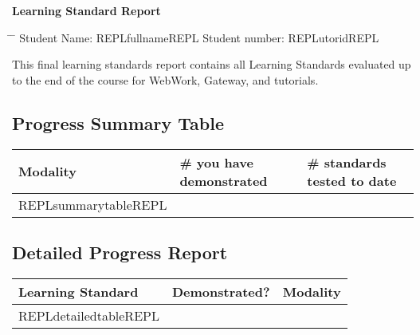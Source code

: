 
\setcounter{page}{1}
{\Large \centering \textbf{Learning Standard Report}}

\begin{tabbing}
    \hspace*{0em}\= \hspace*{12 cm} \= \kill
    \> Student Name: REPLfullnameREPL \>  Student number: REPLutoridREPL \\
\end{tabbing}

This final learning standards report contains all Learning Standards evaluated up to the end of the course for WebWork, Gateway, and tutorials.


\subsection*{Progress Summary Table}
\begin{table}[!htbp]
    \centering
    \begin{tabularx}{\textwidth}{||X|l|l||}
        \toprule
        \textbf{Modality} & \textbf{\# you have demonstrated} & \textbf{\# standards tested to date} \\ \midrule \midrule
        REPLsummarytableREPL
        \bottomrule
    \end{tabularx}
\end{table}

\noindent
\subsection*{Detailed Progress Report}

    \begin{tabularx}{\textwidth}{||X|l|l||}
        \toprule
        \textbf{Learning Standard}           &\textbf{Demonstrated?}        &\textbf{Modality}   \\ \midrule \midrule
        \endhead
        REPLdetailedtableREPL
        \bottomrule
    \end{tabularx}

\newpage

